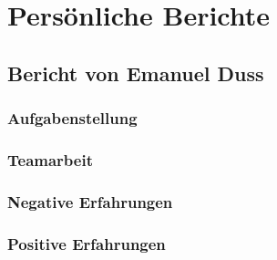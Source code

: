 \chapter{Persönliche Berichte}

\section{Bericht von Emanuel Duss}

\subsection{Aufgabenstellung}

\subsection{Teamarbeit}

\subsection{Negative Erfahrungen}

\subsection{Positive Erfahrungen}
